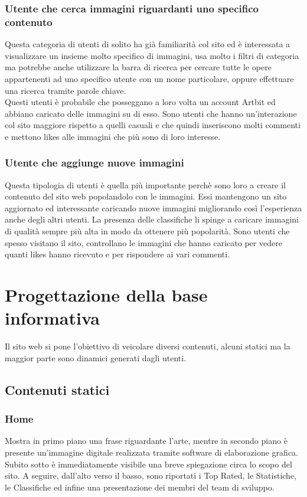 \documentclass[openany, a4paper, 12pt]{report}
\begin{document}
		\subsubsection{Utente che cerca immagini riguardanti uno specifico contenuto}
		Questa categoria di utenti di solito ha già familiarità col sito ed è interessata a visualizzare un insieme molto specifico di immagini, usa molto i filtri di categoria ma potrebbe anche utilizzare la barra di ricerca per cercare tutte le opere appartenenti ad uno specifico utente con un nome particolare, oppure effettuare una ricerca tramite parole chiave.\\
		Questi utenti è probabile che posseggano a loro volta un account Artbit ed abbiano caricato delle immagini su di esso. Sono utenti che hanno un'interazione col sito maggiore rispetto a quelli casuali e che quindi inseriscono molti commenti e mettono likes alle immagini che più sono di loro interesse.\\
		\subsubsection{Utente che aggiunge nuove immagini}
		Questa tipologia di utenti è quella più importante perchè sono loro a creare il contenuto del sito web popolandolo con le immagini. Essi mantengono un sito aggiornato ed interessante caricando nuove immagini migliorando così l'esperienza anche degli altri utenti. La presenza delle classifiche li spinge a caricare immagini di qualità sempre più alta in modo da ottenere più popolarità. Sono utenti che spesso visitano il sito, controllano le immagini che hanno caricato per vedere quanti likes hanno ricevuto e per rispondere ai vari commenti.\\

	\section{Progettazione della base informativa}
		Il sito web si pone l'obiettivo di veicolare diversi contenuti, alcuni statici ma la maggior parte sono dinamici generati dagli utenti.\\
	\subsection{Contenuti statici}
		\subsubsection{Home}
		Mostra in primo piano una frase riguardante l'arte, mentre in secondo piano è presente un'immagine digitale realizzata tramite software di elaborazione grafica. Subito sotto è immediatamente visibile una breve spiegazione circa lo scopo del sito. A seguire, dall'alto verso il basso, sono riportati i Top Rated, le Statistiche, le Classifiche ed infine una presentazione dei membri del team di sviluppo.
		
\end{document}
